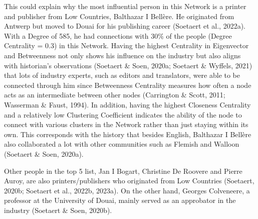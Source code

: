 \documentclass[12pt,a4paper,oneside]{book}
\begin{document}
\begin{sloppypar}
This could explain why the most influential person in this Network is a printer and publisher from Low Countries, Balthazar I Bellère. He originated from Antwerp but moved to Douai for his publishing career (Soetaert et al., 2022a). With a Degree of 585, he had connections with 30\% of the people (Degree Centrality = 0.3) in this Network. Having the highest Centrality in Eigenvector and Betweenness not only shows his influence on the industry but also aligns with historian’s observations (Soetaert \& Soen, 2020a; Soetaert \& Wyffels, 2021) that lots of industry experts, such as editors and translators, were able to be connected through him since Betweenness Centrality measures how often a node acts as an intermediate between other nodes (Carrington \& Scott, 2011; Wasserman \& Faust, 1994). In addition, having the highest Closeness Centrality and a relatively low Clustering Coefficient indicates the ability of the node to connect with various clusters in the Network rather than just staying within its own. This corresponds with the history that besides English, Balthazar I Bellère also collaborated a lot with other communities such as Flemish and Walloon (Soetaert \& Soen, 2020a).

Other people in the top 5 list, Jan I Bogart, Christine De Roovere and Pierre Auroy, are also printers/publishers who originated from Low Countries (Soetaert, 2020b; Soetaert et al., 2022b, 2023a). On the other hand, Georges Colveneere, a professor at the University of Douai, mainly served as an approbator in the industry (Soetaert \& Soen, 2020b).


\end{sloppypar}
\end{document}
